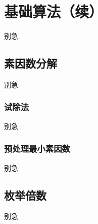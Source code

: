 
\section{基础算法（续）}
\begin{frame}{别急}\end{frame} %
\subsection{素因数分解}
\begin{frame}[c]
  \progressnow*
\end{frame}
\begin{frame}{别急}\end{frame} %
\subsubsection{试除法}
\begin{frame}[c]
  \progressnow
\end{frame}
\begin{frame}{别急}\end{frame} %
\subsubsection{预处理最小素因数}
\begin{frame}[c]
  \progressnow
\end{frame}
\begin{frame}{别急}\end{frame} %
\subsection{枚举倍数}
\begin{frame}[c]
  \progressnow*
\end{frame}
\begin{frame}{别急}\end{frame} %
